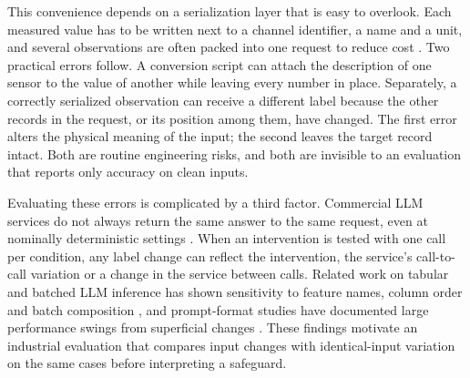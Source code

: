 \documentclass[11pt,a4paper]{article}
\begin{document}
This convenience depends on a serialization layer that is easy to overlook. Each measured value has to be written next to a channel identifier, a name and a unit, and several observations are often packed into one request to reduce cost \citep{cheng2023batch,lin2024batchprompt}. Two practical errors follow. A conversion script can attach the description of one sensor to the value of another while leaving every number in place. Separately, a correctly serialized observation can receive a different label because the other records in the request, or its position among them, have changed. The first error alters the physical meaning of the input; the second leaves the target record intact. Both are routine engineering risks, and both are invisible to an evaluation that reports only accuracy on clean inputs.

Evaluating these errors is complicated by a third factor. Commercial LLM services do not always return the same answer to the same request, even at nominally deterministic settings \citep{ouyang2025nondeterminism,atil2025nondeterminism}. When an intervention is tested with one call per condition, any label change can reflect the intervention, the service's call-to-call variation or a change in the service between calls. Related work on tabular and batched LLM inference has shown sensitivity to feature names, column order and batch composition \citep{hegselmann2023tabllm,liu2026tabularrobustness,cheng2023batch,lin2024batchprompt}, and prompt-format studies have documented large performance swings from superficial changes \citep{sclar2024quantifying,mizrahi2024state}. These findings motivate an industrial evaluation that compares input changes with identical-input variation on the same cases before interpreting a safeguard.
\end{document}
